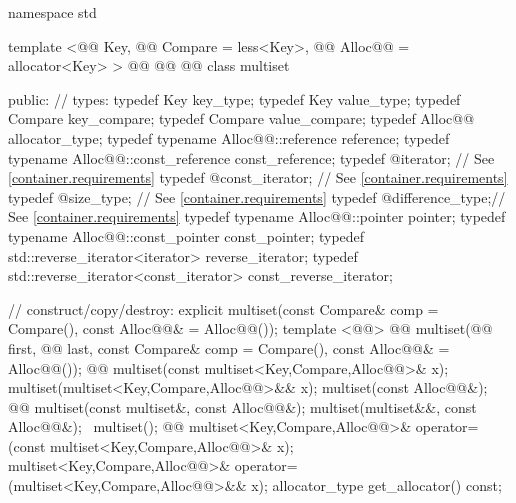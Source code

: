 \documentclass[american,twoside]{book}
\begin{document}
\begin{codeblock}
namespace std {
  template <@@ Key, @@ Compare = less<Key>,
            @@ Alloc@@ = allocator<Key> >
  @@
           @@
           @@
  class multiset {
  public:
    // types:
    typedef Key                                   key_type;
    typedef Key                                   value_type;
    typedef Compare                               key_compare;
    typedef Compare                               value_compare;
    typedef Alloc@@                             allocator_type;
    typedef typename Alloc@@::reference         reference;
    typedef typename Alloc@@::const_reference   const_reference;
    typedef @\impdef@                iterator;       // See \ref{container.requirements}
    typedef @\impdef@                const_iterator; // See \ref{container.requirements}
    typedef @\impdef@                size_type;      // See \ref{container.requirements}
    typedef @\impdef@                difference_type;// See \ref{container.requirements}
    typedef typename Alloc@@::pointer           pointer;
    typedef typename Alloc@@::const_pointer     const_pointer;
    typedef std::reverse_iterator<iterator>       reverse_iterator;
    typedef std::reverse_iterator<const_iterator> const_reverse_iterator;

    // construct/copy/destroy:
    explicit multiset(const Compare& comp = Compare(),
                      const Alloc@@& = Alloc@@());
    template <@@>
      @@
      multiset(@@ first, @@ last,
               const Compare& comp = Compare(),
               const Alloc@@& = Alloc@@());
    @@ 
      multiset(const multiset<Key,Compare,Alloc@@>& x);
    multiset(multiset<Key,Compare,Alloc@@>&& x);
    multiset(const Alloc@@&);
    @@ 
      multiset(const multiset&, const Alloc@@&);
    multiset(multiset&&, const Alloc@@&);
   ~multiset();
    @@
      multiset<Key,Compare,Alloc@@>& operator=(const multiset<Key,Compare,Alloc@@>& x);
    multiset<Key,Compare,Alloc@@>& operator=(multiset<Key,Compare,Alloc@@>&& x);
    allocator_type get_allocator() const;

}}
\end{codeblock}
\end{document}
